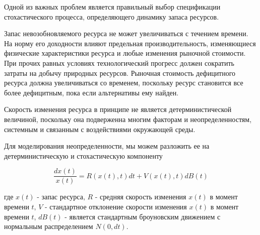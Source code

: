 \documentclass[12pt,a4paper, oneside]{extreport}
\begin{document}
Одной из важных проблем является правильный выбор  спецификации  стохастического процесса, определяющего  динамику запаса ресурсов.


Запас невозобновляемого ресурса  не может увеличиваться с течением времени. На норму его доходности  влияют   предельная производительность, изменяющиеся физические характеристики ресурса и любые изменения рыночной стоимости. 
При прочих равных условиях технологический прогресс должен сократить затраты на добычу природных ресурсов. Рыночная стоимость дефицитного ресурса должна увеличиваться
со временем, поскольку  ресурс становится все более дефицитным, пока если альтернативы ему  найден.


Скорость изменения ресурса в принципе не является  детерминистической величиной, поскольку она подверженна  многим  факторам  и неопределенностям,  системным и связанным с  воздействиями  окружающей среды. 






Для моделирования  неопределенности, мы можем разложить ее на детерминистическую и стохастическую компоненту 

\begin{equation}\label{key}
\dfrac{dx(t)}{x(t)} = R(x(t), t )  dt + V (x(t),t ) dB(t)
\end{equation}

где $ x (t) $ - запас ресурса,   $ R $ - средняя скорость изменения  $ x (t) $ в момент времени $ t $, $ V $ - стандартное отклонение скорости изменения  $ x (t) $ в момент времени $ t $, $ dB (t) $ -   является стандартным броуновским движением с нормальным распределением  $ N (0, dt) $.
\end{document}
